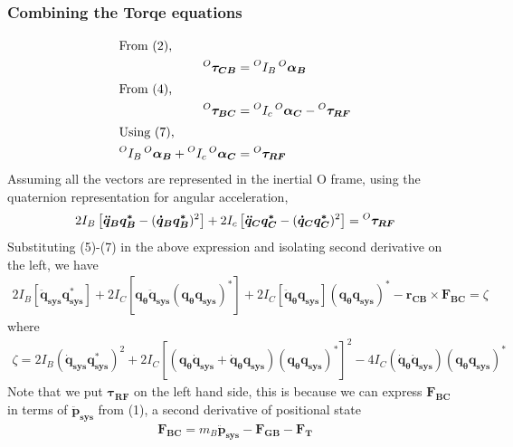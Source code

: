 \subsubsection{Combining the Torqe equations}
\begin{align*}
  \shortintertext{From (2),}
  \prescript{O}{}{\bm{\tau_{CB}}} &= \prescript{O}{}{I_B} \prescript{O}{}{\bm{\alpha_B}} \\
  \shortintertext{From (4),}
  \prescript{O}{}{\bm{\tau_{BC}}} &= \prescript{O}{}{I_c} \prescript{O}{}{\bm{\alpha_C}} - \prescript{O}{}{\bm{\tau_{RF}}}  \\
  \shortintertext{Using (7),}
  \prescript{O}{}{I_B} \prescript{O}{}{\bm{\alpha_B}} + \prescript{O}{}{I_c} \prescript{O}{}{\bm{\alpha_C}} &= \prescript{O}{}{\bm{\tau_{RF}}} \\
\end{align*}  
Assuming all the vectors are represented in the inertial O frame, using the quaternion representation for angular acceleration,
\begin{equation}
  2I_B \left[\bm{\ddot{q}_B}\bm{q_B^*} - (\bm{\dot{q}_B} \bm{q_B^*})^2\right] + 2I_c \left[\bm{\ddot{q}_C}\bm{q_C^*} - (\bm{\dot{q}_C} \bm{q_C^*})^2\right] = \prescript{O}{}{\bm{\tau_{RF}}}
\end{equation}
Substituting (5)-(7) in the above expression and isolating second derivative on the left, we have
\begin{align}
  2 I_B [\bm{\ddot{q}_{sys}} \bm{q_{sys}^*}] + 2I_C [\bm{q_{\theta}}\bm{\ddot{q}_{sys}} (\bm{q_{\theta}} \bm{q_{sys}})^{\bm{*}}] + 2 I_C [\bm{\ddot{q}_{\theta}} \bm{q_{sys}}](\bm{q_{\theta}q_{sys}})^{\bm{*}} - \bm{r_{CB}} \times \bm{F_{BC}} = \zeta
\end{align}
where
\begin{align*}
  \zeta = 2I_B(\bm{\dot{q}_{sys}}\bm{q_{sys}^*})^2 + 2I_C[(\bm{q_\theta} \bm{\dot{q}_{sys}} + \bm{\dot{q}_\theta}\bm{q_{sys}})(\bm{q_{\theta}\bm{q_{sys}}})^{\bm{*}}]^2 - 4I_C(\bm{\dot{q}_{\theta}\dot{q}_{sys}} )(\bm{q_\theta q_{sys}})^{\bm{*}}
\end{align*}
Note that we put $\bm{\tau_{RF}}$ on the left hand side, this is because we can express $\bm{F_{BC}}$ in terms of $\bm{\ddot{p}_{sys}}$ from (1), a second derivative of positional state
\begin{align*}
  \bm{F_{BC}} = m_B \bm{\ddot{p}_{sys}} - \bm{F_{GB}} - \bm{F_{T}}
\end{align*}
